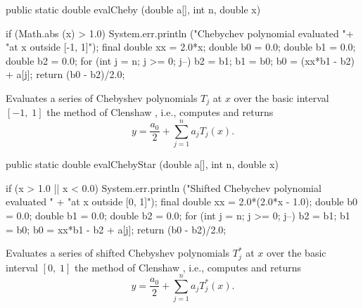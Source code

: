 \begin{code}

   public static double evalCheby (double a[], int n, double x) \begin{hide} {
      if (Math.abs (x) > 1.0)
         System.err.println ("Chebychev polynomial evaluated "+
                               "at x outside [-1, 1]");
      final double xx = 2.0*x;
      double b0 = 0.0;
      double b1 = 0.0;
      double b2 = 0.0;
      for (int j = n; j >= 0; j--) {
         b2 = b1;
         b1 = b0;
         b0 = (xx*b1 - b2) + a[j];
      }
      return (b0 - b2)/2.0;
   }\end{hide}
\end{code}
  \begin{tabb} Evaluates a series of Chebyshev polynomials $T_j$ at
  $x$ over the basic interval $[-1, \;1]$
   the method of Clenshaw
  \cite{mCLE62a}, i.e., computes and  returns
  \[
    y = \frac{a_0}2 + \sum_{j=1}^n a_j T_j (x).
  \]
\begin{htmlonly}
\end{htmlonly}
  \end{tabb}
\begin{code}

   public static double evalChebyStar (double a[], int n, double x) \begin{hide} {
      if (x > 1.0 || x < 0.0)
         System.err.println ("Shifted Chebychev polynomial evaluated " +
                             "at x outside [0, 1]");
      final double xx = 2.0*(2.0*x - 1.0);
      double b0 = 0.0;
      double b1 = 0.0;
      double b2 = 0.0;
      for (int j = n; j >= 0; j--) {
         b2 = b1;
         b1 = b0;
         b0 = xx*b1 - b2 + a[j];
      }
      return (b0 - b2)/2.0;
   }\end{hide}
\end{code}
  \begin{tabb} Evaluates a series of shifted Chebyshev polynomials $T_j^*$
   at $x$ over the basic interval $ [0, \;1]$
   the method of Clenshaw \cite{mCLE62a}, i.e., computes and  returns
  \[
    y = \frac{a_0}2 + \sum_{j=1}^n a_j T_j^* (x).
  \]
\begin{htmlonly}
\end{htmlonly}
  \end{tabb}
